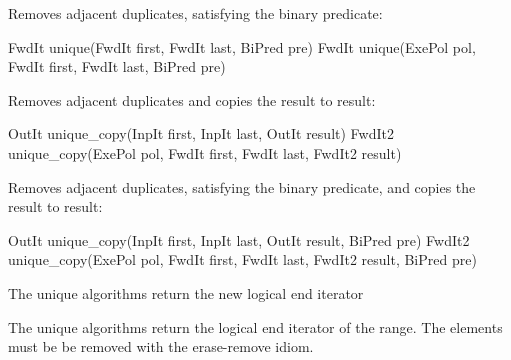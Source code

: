 Removes adjacent duplicates, satisfying the binary predicate:

\begin{cpp}
FwdIt unique(FwdIt first, FwdIt last, BiPred pre)
FwdIt unique(ExePol pol, FwdIt first, FwdIt last, BiPred pre)
\end{cpp}

Removes adjacent duplicates and copies the result to result:

\begin{cpp}
OutIt unique_copy(InpIt first, InpIt last, OutIt result)
FwdIt2 unique_copy(ExePol pol, FwdIt first, FwdIt last, FwdIt2 result)
\end{cpp}

Removes adjacent duplicates, satisfying the binary predicate, and copies the result to result:

\begin{cpp}
OutIt unique_copy(InpIt first, InpIt last, OutIt result, BiPred pre)
FwdIt2 unique_copy(ExePol pol, FwdIt first, FwdIt last,
				   FwdIt2 result, BiPred pre)
\end{cpp}

\begin{myWarning}{The unique algorithms return the new logical end iterator}
	
The unique algorithms return the logical end iterator of the range. The elements must be be removed with the erase-remove idiom.
\end{myWarning}


























